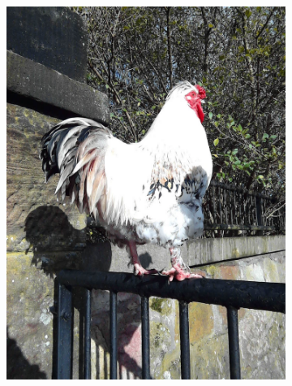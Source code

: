 \documentclass{l4proj}
\begin{document}
\begin{figure}[ht]
\begin{subfigure}[h!]{0.18\textwidth}
    \includegraphics[width=\textwidth, trim={0cm 6cm 0cm 6cm}, clip]{images/dataset/chicken/rgb.png}

\end{subfigure}
\end{figure}
\end{document}
